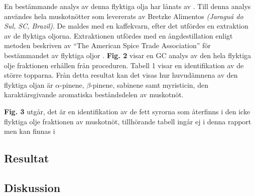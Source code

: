 \documentclass[a4paper,margin=3.25cm]{article}
\begin{document}
En bestämmande analys av denna flyktiga olja har lånats av \cite{spricigo1999extraction}.
Till denna analys användes hela muskotnötter som levererats av Bretzke Alimentos \textit{(Jaraguá do Sul, SC, Brazil)}. De maldes med en kaffekvarn, efter det utfördes
en extraktion av de flyktiga oljorna. Extraktionen utfördes med en ångdestillation enligt metoden beskriven av ``The American Spice Trade Association'' för bestämmandet av flyktiga oljor
\cite[citerad av Ferreira]{spricigo1999extraction}.
\textbf{Fig. 2} visar en GC analys av den hela flyktiga olje fraktionen erhållen
från proceduren. Tabell 1 visar en identifikation av de större topparna.
Från detta resultat kan det visas hur huvudämnena av den flyktiga oljan är $\alpha$-pinene, $\beta$-pinene, sabinene samt myristicin, den karaktärsgivande aromatiska beståndsdelen av muskotnöt.

\textbf{Fig. 3} utgår, det är en identifikation av de fett syrorna som återfinns i den icke flyktiga olje fraktionen av muskotnöt, tillhörande tabell ingår ej i denna rapport men kan finnas i \cite[s.258]{spricigo1999extraction}











	\subsection{Resultat}


	\subsection{Diskussion}
\pagebreak
%
%
%


\printbibliography
\end{document}
